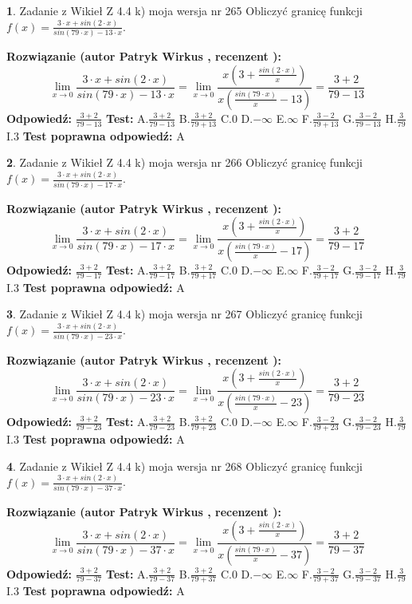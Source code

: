 \documentclass[12pt, a4paper]{article}
\theoremstyle{definition} %
\newtheorem{zad}{}
\newcommand{\zadStart}[1]{\begin{zad}#1\newline}
\newcommand{\zadStop}{\end{zad}}
\newcommand{\rozwStart}[2]{\noindent \textbf{Rozwiązanie (autor #1 , recenzent #2): }\newline}
\newcommand{\rozwStop}{\newline}
\newcommand{\odpStart}{\noindent \textbf{Odpowiedź:}\newline}
\newcommand{\odpStop}{\newline}
\newcommand{\testStart}{\noindent \textbf{Test:}\newline}
\newcommand{\testStop}{\newline}
\newcommand{\kluczStart}{\noindent \textbf{Test poprawna odpowiedź:}\newline}
\newcommand{\kluczStop}{\newline}
\begin{document}
\zadStart{Zadanie z Wikieł Z 4.4 k) moja wersja nr 265}
Obliczyć granicę funkcji $f(x)=\frac{3\cdot x +sin(2\cdot x)}{sin(79\cdot x) -13\cdot x}$.
\zadStop
\rozwStart{Patryk Wirkus}{}
$$\lim\limits_{x\to 0}\frac{3\cdot x +sin(2\cdot x)}{sin(79\cdot x) -13\cdot x}
=\lim\limits_{x\to 0}\frac{x(3+\frac{sin(2\cdot x)}{x})}{x(\frac{sin(79\cdot x)}{x}-13)}
=\frac{3+2}{79-13}$$
\rozwStop
\odpStart
$\frac{3+2}{79-13}$
\odpStop
\testStart
A.$\frac{3+2}{79-13}$
B.$\frac{3+2}{79+13}$
C.$0$
D.$-\infty$
E.$\infty$
F.$\frac{3-2}{79+13}$
G.$\frac{3-2}{79-13}$
H.$\frac{3}{79}$
I.$3$
\testStop
\kluczStart
A
\kluczStop



\zadStart{Zadanie z Wikieł Z 4.4 k) moja wersja nr 266}
Obliczyć granicę funkcji $f(x)=\frac{3\cdot x +sin(2\cdot x)}{sin(79\cdot x) -17\cdot x}$.
\zadStop
\rozwStart{Patryk Wirkus}{}
$$\lim\limits_{x\to 0}\frac{3\cdot x +sin(2\cdot x)}{sin(79\cdot x) -17\cdot x}
=\lim\limits_{x\to 0}\frac{x(3+\frac{sin(2\cdot x)}{x})}{x(\frac{sin(79\cdot x)}{x}-17)}
=\frac{3+2}{79-17}$$
\rozwStop
\odpStart
$\frac{3+2}{79-17}$
\odpStop
\testStart
A.$\frac{3+2}{79-17}$
B.$\frac{3+2}{79+17}$
C.$0$
D.$-\infty$
E.$\infty$
F.$\frac{3-2}{79+17}$
G.$\frac{3-2}{79-17}$
H.$\frac{3}{79}$
I.$3$
\testStop
\kluczStart
A
\kluczStop



\zadStart{Zadanie z Wikieł Z 4.4 k) moja wersja nr 267}
Obliczyć granicę funkcji $f(x)=\frac{3\cdot x +sin(2\cdot x)}{sin(79\cdot x) -23\cdot x}$.
\zadStop
\rozwStart{Patryk Wirkus}{}
$$\lim\limits_{x\to 0}\frac{3\cdot x +sin(2\cdot x)}{sin(79\cdot x) -23\cdot x}
=\lim\limits_{x\to 0}\frac{x(3+\frac{sin(2\cdot x)}{x})}{x(\frac{sin(79\cdot x)}{x}-23)}
=\frac{3+2}{79-23}$$
\rozwStop
\odpStart
$\frac{3+2}{79-23}$
\odpStop
\testStart
A.$\frac{3+2}{79-23}$
B.$\frac{3+2}{79+23}$
C.$0$
D.$-\infty$
E.$\infty$
F.$\frac{3-2}{79+23}$
G.$\frac{3-2}{79-23}$
H.$\frac{3}{79}$
I.$3$
\testStop
\kluczStart
A
\kluczStop



\zadStart{Zadanie z Wikieł Z 4.4 k) moja wersja nr 268}
Obliczyć granicę funkcji $f(x)=\frac{3\cdot x +sin(2\cdot x)}{sin(79\cdot x) -37\cdot x}$.
\zadStop
\rozwStart{Patryk Wirkus}{}
$$\lim\limits_{x\to 0}\frac{3\cdot x +sin(2\cdot x)}{sin(79\cdot x) -37\cdot x}
=\lim\limits_{x\to 0}\frac{x(3+\frac{sin(2\cdot x)}{x})}{x(\frac{sin(79\cdot x)}{x}-37)}
=\frac{3+2}{79-37}$$
\rozwStop
\odpStart
$\frac{3+2}{79-37}$
\odpStop
\testStart
A.$\frac{3+2}{79-37}$
B.$\frac{3+2}{79+37}$
C.$0$
D.$-\infty$
E.$\infty$
F.$\frac{3-2}{79+37}$
G.$\frac{3-2}{79-37}$
H.$\frac{3}{79}$
I.$3$
\testStop
\kluczStart
A
\kluczStop
\end{document}
